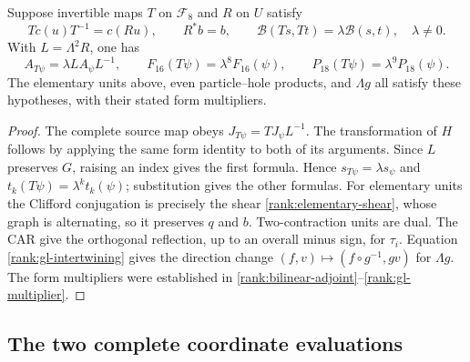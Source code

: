 \begin{lemma}\label{rank:covariance}
Suppose invertible maps $T$ on $\mathcal F_8$ and $R$ on $U$ satisfy
\[
 Tc(u)T^{-1}=c(Ru),\qquad R^*b=b,\qquad
 \mathcal B(Ts,Tt)=\lambda\mathcal B(s,t),\quad\lambda\ne0.
\]
With $L=\Lambda^2R$, one has
\begin{equation}
 A_{T\psi}=\lambda LA_\psi L^{-1},\qquad
 F_{16}(T\psi)=\lambda^8F_{16}(\psi),\qquad
 P_{18}(T\psi)=\lambda^9P_{18}(\psi).
 \label{rank:relative-invariant}
\end{equation}
The elementary units above, even particle--hole products, and $\Lambda g$
all satisfy these hypotheses, with their stated form multipliers.
\end{lemma}
\begin{proof}
The complete source map obeys $J_{T\psi}=TJ_\psi L^{-1}$.
The transformation of $H$ follows by applying the same form identity to
both of its arguments. Since $L$ preserves $G$, raising an index gives
the first formula. Hence $s_{T\psi}=\lambda s_\psi$ and
$t_k(T\psi)=\lambda^k t_k(\psi)$; substitution gives the other formulas.
For elementary units the Clifford conjugation is precisely the shear
\eqref{rank:elementary-shear}, whose graph is alternating, so it preserves
$q$ and $b$. Two-contraction units are dual. The CAR give the orthogonal
reflection, up to an overall minus sign, for $\tau_i$. Equation
\eqref{rank:gl-intertwining} gives the direction change
$(f,v)\mapsto(f\circ g^{-1},gv)$ for $\Lambda g$. The form multipliers
were established in \eqref{rank:bilinear-adjoint}--\eqref{rank:gl-multiplier}.
\end{proof}

\subsection{The two complete coordinate evaluations}

